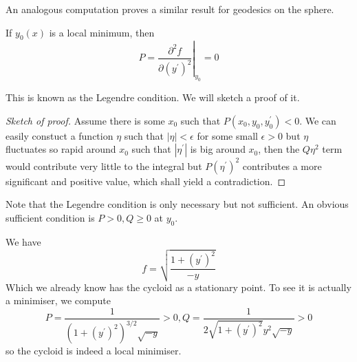 \documentclass[a4paper]{article}
\begin{document}
An analogous computation proves a similar result for geodesics on the sphere.
\begin{proposition}
    If $y_0(x)$ is a local minimum, then
    $$P=\left.\frac{\partial^2 f}{\partial (y^\prime)^2}\right|_{y_0}=0$$
\end{proposition}
This is known as the Legendre condition.
We will sketch a proof of it.
\begin{proof}[Sketch of proof]
    Assume there is some $x_0$ such that $P(x_0,y_0,y_0^\prime)<0$.
    We can easily constuct a function $\eta$ such that $|\eta|<\epsilon$ for some small $\epsilon>0$ but $\eta$ fluctuates so rapid around $x_0$ such that $|\eta^\prime|$ is big around $x_0$, then the $Q\eta^2$ term would contribute very little to the integral but $P(\eta^\prime)^2$ contributes a more significant and positive value, which shall yield a contradiction.
\end{proof}
Note that the Legendre condition is only necessary but not sufficient.
An obvious sufficient condition is $P>0,Q\ge 0$ at $y_0$.
\begin{example}
    We have
    $$f=\sqrt{\frac{1+(y^\prime)^2}{-y}}$$
    Which we already know has the cycloid as a stationary point.
    To see it is actually a minimiser, we compute
    $$P=\frac{1}{(1+(y^\prime)^2)^{3/2}\sqrt{-y}}>0,Q=\frac{1}{2\sqrt{1+(y^\prime)^2}y^2\sqrt{-y}}>0$$
    so the cycloid is indeed a local minimiser.
\end{example}
\end{document}
